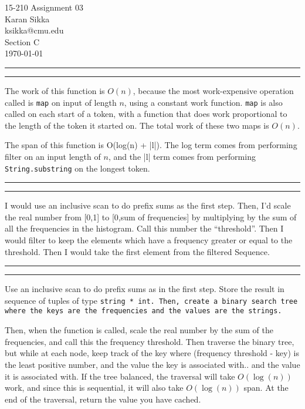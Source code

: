 \documentclass[11pt,letterpaper]{article}
\makeatletter
\newcommand{\question}[2] {\vspace{.25in} \hrule\vspace{0.5em}
\noindent{\bf #1: #2} \vspace{0.5em}
\hrule \vspace{.10in}}
\newcommand{\myname}{Karan Sikka}
\newcommand{\myandrew}{ksikka@cmu.edu}
\newcommand{\myhwnum}{03}
\makeatother
\begin{document}
\medskip

\thispagestyle{plain}
\begin{center}                  %
{\Large 15-210 Assignment \myhwnum} \\
\myname \\
\myandrew \\
Section C\\
\today\\
\end{center}


\question{1}{Task 2.2}
  The work of this function is $O(n)$, because the most work-expensive operation
  called is \texttt{map} on input of length $n$, using a constant work function.
  \texttt{map} is also called on each start of a token, with a function that does
  work proportional to the length of the token it started on. The total work of these
  two maps is $O(n)$.

  The span of this function is O(log(n) + |l|). The log term comes from performing
  filter on an input length of $n$, and the |l| term comes from performing \texttt{String.substring}
  on the longest token.

\question{2}{Task 4.2}
  I would use an inclusive scan to do prefix sums as the first step. Then, I'd
  scale the real number from [0,1] to [0,sum of frequencies] by multiplying
  by the sum of all the frequencies in the histogram. Call this number the ``threshold''.
  Then I would filter to keep the elements which have a frequency greater
  or equal to the threshold. Then I would take the first element from the filtered Sequence.

\question{3}{Task 4.3}
  Use an inclusive scan to do prefix sums as in the first step. Store the
  result in sequence of tuples of type \tt{string * int}. Then, create a binary
  search tree where the keys are the frequencies and the values are the strings.
  
  Then, when the function is called, scale the real number by the sum of the frequencies, and call this the
  frequency threshold. Then traverse the binary tree, but while at each node, keep track of the key
  where (frequency threshold - key) is the least positive number, and the value the key is associated with..
  and the value it is associated with. If the tree balanced, the traversal will take $O(\log(n))$ work, and since this is
  sequential, it will also take $O(\log(n))$ span. At the end of the traversal, return the value you have cached.
  
\end{document}
